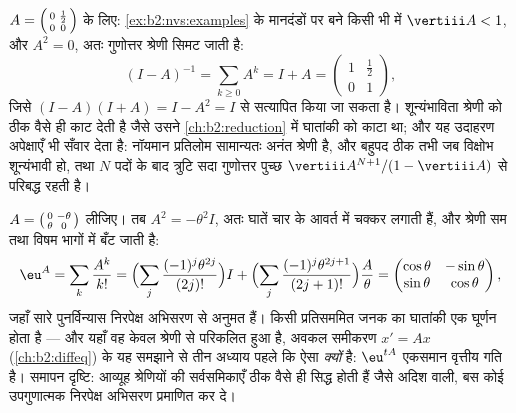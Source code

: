 \begin{example}[एक नॉयमान श्रेणी जो समाप्त हो जाती है]\label{ex:b2:nvs:neumannfinite}
$A = \begin{psmallmatrix}0 & \frac12\\ 0 &
0\end{psmallmatrix}$ के लिए: \cref{ex:b2:nvs:examples} के मानदंडों पर बने किसी भी  में $\vertiii A < 1$, और
$A^2 = 0$, अतः गुणोत्तर श्रेणी सिमट जाती है:
\[
(I - A)^{-1} = \sum_{k \geq 0} A^k = I + A =
\begin{pmatrix}1 & \tfrac12\\ 0 & 1\end{pmatrix},
\]
जिसे $(I - A)(I + A) = I - A^2 = I$ से सत्यापित किया जा सकता है। शून्यंभाविता श्रेणी को ठीक वैसे
ही काट देती है जैसे उसने \cref{ch:b2:reduction} में घातांकी को काटा था; और यह उदाहरण
अपेक्षाएँ भी सँवार देता है: नॉयमान प्रतिलोम सामान्यतः अनंत श्रेणी है,
और बहुपद ठीक तभी जब विक्षोभ शून्यंभावी हो, तथा $N$ पदों के बाद त्रुटि
सदा गुणोत्तर पुच्छ $\vertiii A^{N+1}/(1 - \vertiii A)$ से परिबद्ध रहती है।
\end{example}

\begin{example}[किसी घूर्णन जनक का घातांकी]\label{ex:b2:nvs:rotationexp}
$A = \begin{psmallmatrix}0 & -\theta\\ \theta &
0\end{psmallmatrix}$ लीजिए। तब $A^2 = -\theta^2 I$, अतः घातें चार के आवर्त में चक्कर लगाती हैं, और
श्रेणी सम तथा विषम भागों में बँट जाती है:
\[
\eu^{A} = \sum_{k}\frac{A^k}{k!}
= \Bigl(\sum_{j}\frac{(-1)^j\theta^{2j}}{(2j)!}\Bigr) I
+ \Bigl(\sum_{j}\frac{(-1)^j\theta^{2j+1}}{(2j+1)!}\Bigr)
\frac{A}{\theta}
= \begin{pmatrix}
\cos\theta & -\sin\theta\\
\sin\theta & \cos\theta
\end{pmatrix},
\]
जहाँ सारे पुनर्विन्यास निरपेक्ष अभिसरण से अनुमत हैं। किसी प्रतिसममित
जनक का घातांकी एक घूर्णन होता है --- और यहाँ वह केवल श्रेणी से परिकलित
हुआ है, अवकल समीकरण $x' = Ax$ (\cref{ch:b2:diffeq}) के यह समझाने से तीन अध्याय पहले कि ऐसा
\emph{क्यों} है: $\eu^{tA}$ एकसमान वृत्तीय गति है। समापन दृष्टि: आव्यूह
श्रेणियों की सर्वसमिकाएँ ठीक वैसे ही सिद्ध होती हैं जैसे अदिश वाली, बस
कोई उपगुणात्मक  निरपेक्ष अभिसरण प्रमाणित कर दे।
\end{example}

